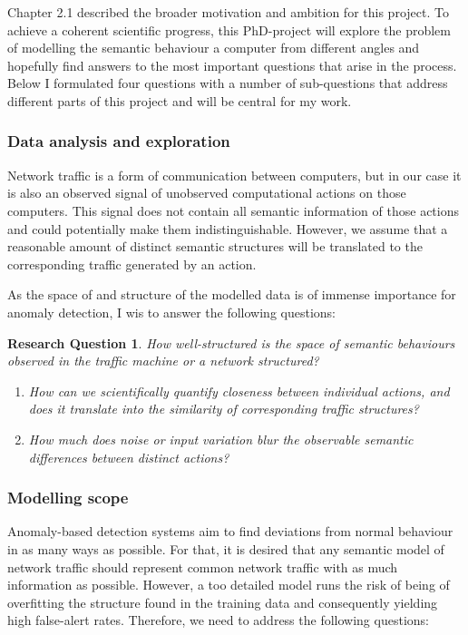 \documentclass[a4paper,12pt,twoside]{report}
\newtheorem{rquestion}{Research Question}
\begin{document}
Chapter 2.1 described the broader motivation and ambition for this project. To achieve a coherent scientific progress, this PhD-project will explore the problem of modelling the semantic behaviour a computer from different angles and hopefully find answers to the most important questions that arise in the process. Below I formulated four questions with a number of sub-questions that address different parts of this project and will be central for my work.

\subsubsection{Data analysis and exploration}

Network traffic is a form of communication between computers, but in our case it is also an observed signal of unobserved computational actions on those computers. This signal does not contain all semantic information of those actions and could potentially make them indistinguishable. 
However, we assume that a reasonable amount of distinct semantic structures will be translated to the corresponding traffic generated by an action.

As the space of and structure of the modelled data is of immense importance for anomaly detection, I wis to answer the following questions:

\begin{rquestion}
How well-structured is the space of semantic behaviours observed in the traffic  machine or a network structured? 
\begin{enumerate}
\item How can we scientifically quantify closeness between individual actions, and does it translate into the similarity of corresponding traffic structures? 
\item How much does noise or input variation blur the observable semantic differences between distinct actions?
\end{enumerate}
\end{rquestion}

\subsubsection{Modelling scope}

Anomaly-based detection systems aim to find deviations from normal behaviour in as many ways as possible. For that, it is desired that any semantic model of network traffic should represent common network traffic with as much information as possible. However, a too detailed model runs the risk of being of overfitting the structure found in the training data and consequently yielding high false-alert rates. Therefore, we need to address the following questions: 
\end{document}
